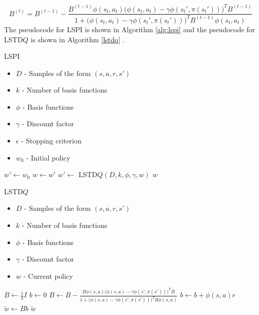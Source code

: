 \begin{equation}
\label{eq:lspi}
    B^{(t)} = B^{(t-1)} - \frac{B^{(t-1)}\phi(s_t,a_t)\big(\phi(s_t,a_t) - \gamma\phi(s_t',\pi(s_t'))\big)^TB^{(t-1)}}{1 + \big(\phi(s_t,a_t) - \gamma\phi(s_t',\pi(s_t'))\big)^TB^{(t-1)}\phi(s_t,a_t)}
\end{equation}
The pseudocode for LSPI is shown in Algorithm \ref{alg:lspi} and the pseudocode for LSTD$Q$ is shown in Algorithm \ref{lstdq} \cite{lspi}.

\begin{algorithm}
\caption{LSPI}
\label{alg:lspi}
    {\fontsize{12}{10}\selectfont
    \begin{algorithmic}[1]
        \REQUIRE
            \begin{itemize} 
                \item $D$ - Samples of the form $(s,a,r,s')$ 
                \item $k$ - Number of basis functions
                \item $\phi$ - Basis functions
                \item $\gamma$ - Discount factor
                \item $\epsilon$ - Stopping criterion
                \item $w_0$ - Initial policy
            \end{itemize}
        \STATE $w' \leftarrow w_0$
        \REPEAT
            \STATE $w \leftarrow w'$
            \STATE $w' \leftarrow$ LSTD$Q (D, k, \phi, \gamma, w)$
        \RETURN $w$
    \end{algorithmic}
    }
\end{algorithm}

\begin{algorithm}
\caption{LSTD$Q$}
\label{lstdq}
    {\fontsize{12}{10}\selectfont
    \begin{algorithmic}[1]
        \REQUIRE
            \begin{itemize} 
                \item $D$ - Samples of the form $(s,a,r,s')$ 
                \item $k$ - Number of basis functions
                \item $\phi$ - Basis functions
                \item $\gamma$ - Discount factor
                \item $w$ - Current policy
            \end{itemize}
        \STATE $B \leftarrow \frac{1}{\delta}I$ 
        \STATE $b \leftarrow 0$ 
            \STATE $B \leftarrow B - \frac{B\phi(s,a)\big(\phi(s,a) - \gamma\phi(s',\pi(s'))\big)^TB}{1 + \big(\phi(s,a) - \gamma\phi(s',\pi(s'))\big)^TB\phi(s,a)}$
            \STATE $b \leftarrow b + \phi(s,a)r$
        \ENDFOR
        \STATE $\tilde{w} \leftarrow Bb$
        \RETURN $\tilde{w}$
    \end{algorithmic}
    }
\end{algorithm}

